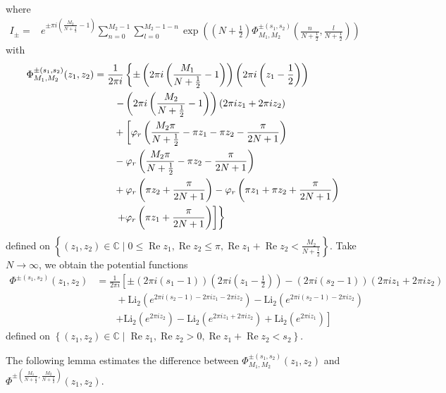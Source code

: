\documentclass[10pt,a4paper]{article}
\newcommand{\lt}{\left}
\newcommand{\rt}{\right}
\def \CC{\mathbb C}
\def \Re{\operatorname{Re}}
\def\CC{{\mathbb C}}
\def \Re{\operatorname{Re}}
\def \Li{\operatorname{Li_2}}
\begin{document}
where
\begin{align}
I_\pm =
& e^{\pm\pi i \lt(\frac{M_2}{N+\frac{1}{2}} - 1\rt) }\sum_{n=0}^{M_2-1} \sum_{l=0}^{M_2-1-n} \exp\lt( \lt(N+\frac{1}{2}\rt)\Phi^{\pm(s_1, s_2)}_{M_1, M_2} \lt(\frac{n}{N+\frac{1}{2}},\frac{l}{N+\frac{1}{2}}\rt) \rt)
\end{align}
with
\begin{align}
\Phi^{\pm(s_1, s_2)}_{M_1, M_2} (z_1,z_2) 
&= \frac{1}{2\pi i}\lt\{ \pm \lt(2\pi i \lt(\frac{M_1}{N+\frac{1}{2}} - 1\rt)\rt) \lt(2\pi i \lt(z_1 -\frac{1}{2} \rt)\rt) \rt. \notag \\
&\qquad \lt.  - \lt(2\pi i \lt(\frac{M_2}{N+\frac{1}{2}} - 1\rt)\rt)(2\pi i z_1 + 2\pi i z_2) \rt. \notag \\
&\qquad  + \lt[\varphi_r \lt( \frac{M_2\pi}{N+\frac{1}{2}}  - \pi z_1 - \pi z_2 -\frac{\pi}{2N+1}\rt) \rt.  \notag\\
&\qquad  - \varphi_r\lt(  \frac{M_2\pi}{N+\frac{1}{2}} - \pi z_2- \frac{\pi}{2N+1}\rt) \notag \\
&\qquad  + \varphi_r \lt(\pi z_2 + \frac{\pi}{2N+1}\rt)  - \varphi_r\lt( \pi z_1 + \pi z_2 + \frac{\pi}{2N+1}\rt) \notag\\
&\lt.\lt.\qquad  + \varphi_r\lt( \pi z_1 + \frac{\pi}{2N+1}\rt) \rt] \rt\}
\end{align}
defined on $\lt\{ (z_1,z_2) \in \CC \mid 0 \leq \Re z_1 , \Re z_2 \leq \pi, \Re z_1 + \Re z_2 < \frac{M_2}{N+\frac{1}{2}} \rt\}$. Take $N\to \infty$, we obtain the potential functions 
\begin{align*}
\Phi^{\pm(s_1, s_2)} (z_1,z_2) 
&=  \frac{1}{2\pi i} \lt[ \pm \lt(2\pi i \lt( s_1 - 1\rt)\rt) \lt(2\pi i \lt(z_1 -\frac{1}{2} \rt)\rt)  - (2\pi i (s_2-1))(2\pi i z_1 + 2\pi i z_2)  \rt. \\
&\qquad + \Li\lt(e^{2\pi i (s_2-1) - 2\pi i z_1 - 2\pi i z_2}\rt) - \Li\lt( e^{2\pi i (s_2-1) - 2\pi i z_2 }\rt) \\
&\qquad \lt.+ \Li \lt(e^{2\pi i z_2}\rt) - \Li\lt(e^{2\pi iz_1+ 2\pi i z_2}\rt) + \Li\lt(e^{2\pi i z_1}\rt)  \rt]
\end{align*}
defined on $\lt\{ (z_1,z_2) \in \CC \mid \Re z_1 , \Re z_2 >0, \Re z_1 + \Re z_2 < s_2 \rt\}$.

The following lemma estimates the difference between $\Phi^{\pm(s_1, s_2)}_{M_1, M_2} (z_1,z_2) $ and $\Phi^{\pm\lt(\frac{M_1}{N+\frac{1}{2}}, \frac{M_2}{N+\frac{1}{2}}\rt)} (z_1,z_2) $.
\end{document}
